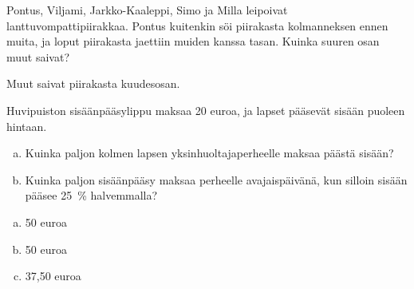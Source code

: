     
    \begin{tehtava} %
        Pontus, Viljami, Jarkko-Kaaleppi, Simo ja Milla leipoivat lanttuvompattipiirakkaa.
        Pontus kuitenkin söi piirakasta kolmanneksen ennen muita, ja loput piirakasta
        jaettiin muiden kanssa tasan. Kuinka suuren osan muut saivat?
        
        \begin{vastaus}
            Muut saivat piirakasta kuudesosan.
        \end{vastaus}
    \end{tehtava}
    
    \begin{tehtava} %
        Huvipuiston sisäänpääsylippu maksaa 20 euroa, ja lapset pääsevät
        sisään puoleen hintaan.
	\begin{enumerate}[a)]
		\item Kuinka paljon kolmen lapsen yksinhuoltajaperheelle maksaa päästä sisään?
		\item Kuinka paljon sisäänpääsy maksaa perheelle avajaispäivänä,
		kun silloin sisään pääsee 25~\% halvemmalla?
        \end{enumerate}
        \begin{vastaus}
	\begin {enumerate}[a)]
         \item 50 euroa 
           \item 50 euroa 
	\item 37,50 euroa
\end{enumerate} 
       \end{vastaus}
    \end{tehtava}  
  
